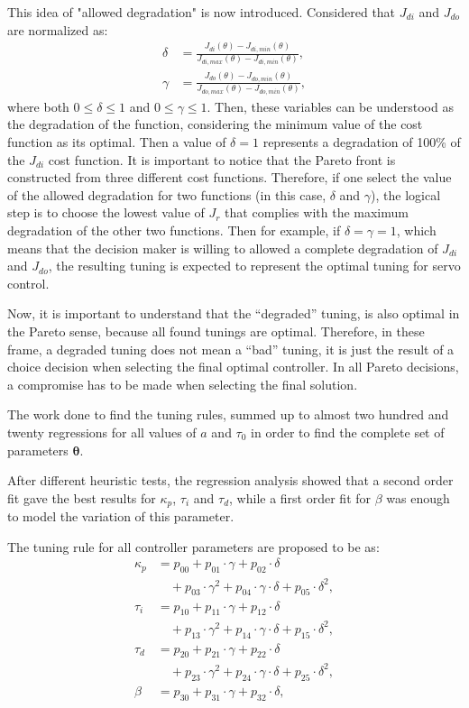 This idea of "allowed degradation" is now introduced. Considered that $J_{di}$ and $J_{do}$ are normalized as:
%
\begin{align}
\delta &= \frac{J_{di}(\theta)-J_{di, min}(\theta)}{J_{di,max}(\theta)-J_{di,min}(\theta)},\label{eq:delta}\\
\gamma &= \frac{J_{do}(\theta)-J_{do, min}(\theta)}{J_{do,max}(\theta)-J_{do,min}(\theta)},\label{eq:gamma}
\end{align}
%
where both $0 \le \delta \le 1$ and $0 \le \gamma \le 1$. Then, these variables can be understood as the degradation of the function, considering the minimum value of the cost function as its optimal. Then a value of $\delta=1$ represents a degradation of 100\% of the $J_{di}$ cost function. It is important to notice that the Pareto front is constructed from three different cost functions. Therefore, if one select the value of the allowed degradation for two functions (in this case, $\delta$ and $\gamma$), the logical step is to choose the lowest value of $J_r$ that complies with the maximum degradation of the other two functions. Then for example,  if $\delta=\gamma=1$, which means that the decision maker is willing to allowed a complete degradation of $J_{di}$ and $J_{do}$, the resulting tuning is expected to represent the optimal tuning for servo control.

Now, it is important to understand that the ``degraded'' tuning, is also optimal in the Pareto sense, because all found tunings are optimal. Therefore, in these frame, a degraded tuning does not mean a ``bad'' tuning, it is just the result of a choice decision when selecting the final optimal controller. In all Pareto decisions, a compromise has to be made when selecting the final solution.

The work done to find the tuning rules, summed up to almost two hundred and twenty regressions for all values of $a$ and $\tau_0$ in order to find the complete set of parameters $\bm{\theta}$.

After different heuristic tests, the regression analysis showed that a second order fit gave the best results for $\kappa_p$, $\tau_i$ and $\tau_d$,  while  a first order fit for $\beta$ was enough to model the variation of this parameter. 

The tuning rule for all controller parameters are proposed to be as:  
%
\begin{align}
\kappa_p &= p_{00}+p_{01}\cdot\gamma+p_{02}\cdot\delta\nonumber\\
&\quad + p_{03}\cdot\gamma^2+p_{04}\cdot\gamma\cdot \delta+p_{05}\cdot\delta^2,\label{E:eqkp}\\
%
\tau_i &= p_{10}+p_{11}\cdot\gamma+p_{12}\cdot\delta\nonumber\\
&\quad + p_{13}\cdot\gamma^2+p_{14}\cdot\gamma\cdot \delta+p_{15}\cdot\delta^2,\label{E:eqTi}\\
%
\tau_d &= p_{20}+p_{21}\cdot\gamma+p_{22}\cdot\delta\nonumber\\
&\quad+p_{23}\cdot\gamma^2+p_{24}\cdot\gamma\cdot \delta+p_{25}\cdot\delta^2,\label{E:eqTd}\\
%
\beta &=p_{30}+p_{31}\cdot\gamma+p_{32}\cdot\delta,\label{E:eqbeta}
\end{align}
%


